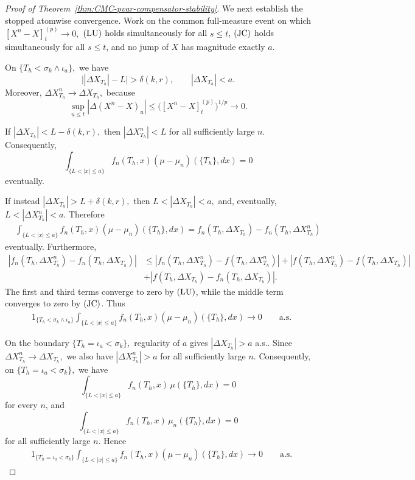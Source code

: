 \documentclass[a4paper,10pt]{article}
\begin{document}
\begin{proof}[Proof of Theorem~\ref{thm:CMC-pvar-compensator-stability}]
We next establish the stopped atomwise convergence. Work on the common
full-measure event on which
\\$
        [X^n-X]^{(p)}_t\longrightarrow0,
$
\({\rm (LU)}\) holds simultaneously for all \(s\le t\),
\({\rm (JC)}\) holds simultaneously for all \(s\le t\), and no jump
of \(X\) has magnitude exactly \(a\).

On
$
        \{T_h<\sigma_k\wedge\iota_a\},
$
we have
\[
\bigl||\Delta X_{T_h}|-L\bigr|>\delta(k,r),
\qquad
|\Delta X_{T_h}|<a.
\]
Moreover,
$
        \Delta X^n_{T_h}\longrightarrow\Delta X_{T_h},
$
because
\[
\sup_{u\le t}|\Delta(X^n-X)_u|
\le
\bigl([X^n-X]^{(p)}_t\bigr)^{1/p}
\longrightarrow0.
\]

If
$
        |\Delta X_{T_h}|<L-\delta(k,r),
$
then
$
        |\Delta X^n_{T_h}|<L
$
for all sufficiently large \(n\). Consequently,
\[
\int_{\{L<|x|\le a\}}
f_n(T_h,x)(\mu-\mu_n)(\{T_h\},dx)
=
0
\]
eventually.

If instead
$
        |\Delta X_{T_h}|>L+\delta(k,r),
$
then
$
        L<|\Delta X_{T_h}|<a,
$
and, eventually,
$
        L<|\Delta X^n_{T_h}|<a.
$
Therefore
\[
\begin{aligned}
&\int_{\{L<|x|\le a\}}
f_n(T_h,x)(\mu-\mu_n)(\{T_h\},dx)
=
f_n(T_h,\Delta X_{T_h})
-
f_n(T_h,\Delta X^n_{T_h})
\end{aligned}
\]
eventually. Furthermore,
\[
\begin{aligned}
|f_n(T_h,\Delta X^n_{T_h})
-
f_n(T_h,\Delta X_{T_h})|
&\le
|f_n(T_h,\Delta X^n_{T_h})
-
f(T_h,\Delta X^n_{T_h})|
+
|f(T_h,\Delta X^n_{T_h})
-
f(T_h,\Delta X_{T_h})|
\\
&+
|f(T_h,\Delta X_{T_h})
-
f_n(T_h,\Delta X_{T_h})|.
\end{aligned}
\]
The first and third terms converge to zero by \({\rm (LU)}\), while
the middle term converges to zero by \({\rm (JC)}\). Thus
\begin{align}
&1_{\{T_h<\sigma_k\wedge\iota_a\}}
\int_{\{L<|x|\le a\}}
f_n(T_h,x)(\mu-\mu_n)(\{T_h\},dx)
\longrightarrow0
\qquad\text{a.s.}
\label{eq:pvar-stopped-atomwise-annulus}
\end{align}

On the boundary
$
        \{T_h=\iota_a<\sigma_k\},
$
regularity of \(a\) gives
$
        |\Delta X_{T_h}|>a$ a.s..
Since
$
        \Delta X^n_{T_h}\longrightarrow\Delta X_{T_h},
$
we also have
$
        |\Delta X^n_{T_h}|>a
$
for all sufficiently large \(n\). Consequently, on
$
        \{T_h=\iota_a<\sigma_k\},
$
we have
\[
\int_{\{L<|x|\le a\}}
f_n(T_h,x)\,\mu(\{T_h\},dx)
=
0
\]
for every \(n\), and
\[
\int_{\{L<|x|\le a\}}
f_n(T_h,x)\,\mu_n(\{T_h\},dx)
=
0
\]
for all sufficiently large \(n\).
 Hence
\begin{align}
&1_{\{T_h=\iota_a<\sigma_k\}}
\int_{\{L<|x|\le a\}}
f_n(T_h,x)(\mu-\mu_n)(\{T_h\},dx)
\longrightarrow0
\qquad\text{a.s.}
\label{eq:pvar-iota-boundary}
\end{align}


\end{proof}
\end{document}
